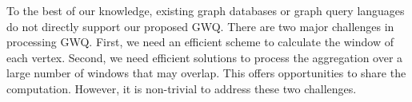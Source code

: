 %
% 
%


%

To the best of our knowledge, existing graph databases or graph query languages
do not directly support our proposed GWQ. There are two major challenges 
in processing GWQ. First, we need an efficient scheme to  
calculate the window of each vertex. Second, we need
efficient solutions to process the aggregation over a large number 
of windows that may overlap. This offers opportunities to share the 
computation. However, it is non-trivial to address these two challenges.  


